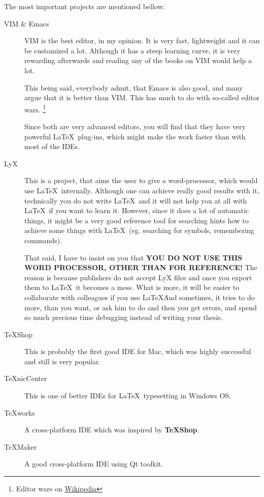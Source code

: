 \documentclass[a4paper]{article}
\begin{document}
The most important projects are mentioned bellow:
\begin{description}
    \item[VIM \& Emacs] VIM is the best editor, in my opinion. It is very fast,
        lightweight and it can be customized a lot. Although it has a steep
        learning curve, it is very rewarding afterwards and reading any of the
        books on VIM would help a lot. 
        
        This being said, everybody admit, that Emacs is also good, and many
        argue that it is better than VIM. This has much to do with so-called
        editor wars.
        \footnote{Editor wars on
        \href{http://en.wikipedia.org/wiki/Editor_war}{Wikipedia}}

        Since both are very advanced editors, you will find that they have very
        powerful \LaTeX\ plug-ins, which might make the work faster than with
        most of the IDEs.

    \item[LyX] This is a project, that aims the user to give a word-processor,
        which would use \LaTeX\ internally. Although one can achieve really good
        results with it, technically you do not write \LaTeX\ and it will not
        help you at all with \LaTeX\ if you want to learn it. However, since it
        does a lot of automatic things, it might be a very good reference tool
        for searching hints how to achieve some things with \LaTeX\ (eg.
        searching for symbols, remembering commands). 
        
        That said, I have to insist on you that {\bfseries YOU DO NOT USE THIS
        WORD PROCESSOR, OTHER THAN FOR REFERENCE!} The reason is because
        publishers do not accept LyX files and once you export them to \LaTeX\,
        it becomes a mess. What is more, it will be easier to collaborate with
        colleagues if you use \LaTeX\. And sometimes, it tries to do more, than
        you want, or ask him to do and then you get errors, and spend so much
        precious time debugging instead of writing your thesis.

    \item[TeXShop] This is probably the first good IDE for Mac, which was highly
        successful and still is very popular.

    \item[TeXnicCenter] This is one of better IDEs for \LaTeX\ typesetting in
        Windows OS. 

    \item[TeXworks] A cross-platform IDE which was inspired by \textbf{TeXShop}.

    \item[TeXMaker] A good cross-platform IDE using Qt toolkit.
\end{description}
\end{document}
